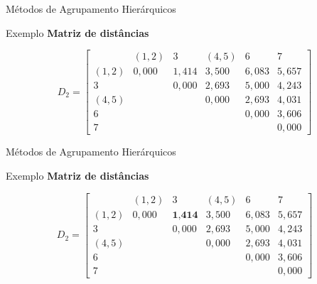 \documentclass[
  ignorenonframetext,
  aspectratio=169,
]{beamer}
\begin{document}
\begin{frame}{Métodos de Agrupamento Hierárquicos}
\label{muxe9todos-de-agrupamento-hieruxe1rquicos-20}
\begin{block}{Exemplo}
\label{exemplo-9}
\textbf{Matriz de distâncias}

\[D_2 = \left[ \begin{matrix}
&(1,2)&3&(4,5)&6&7\\ 
(1,2)& 0,000 & 1,414 & 3,500 &  6,083 & 5,657 \\
3  &  & 0,000 & 2,693 & 5,000 & 4,243 \\
(4,5)  &  &  & 0,000 &  2,693 & 4,031 \\
6  &  &    &  & 0,000 & 3,606 \\
7  &  &    &  &  & 0,000
                    \end{matrix} \right]\]
\end{block}
\end{frame}

\begin{frame}{Métodos de Agrupamento Hierárquicos}
\label{muxe9todos-de-agrupamento-hieruxe1rquicos-21}
\begin{block}{Exemplo}
\label{exemplo-10}
\textbf{Matriz de distâncias}

\[D_2 = \left[ \begin{matrix}
&(1,2)&3&(4,5)&6&7\\ 
(1,2)& 0,000 & \textbf{1,414} & 3,500 &  6,083 & 5,657 \\
3  &  & 0,000 & 2,693 & 5,000 & 4,243 \\
(4,5)  &  &  & 0,000 &  2,693 & 4,031 \\
6  &  &    &  & 0,000 & 3,606 \\
7  &  &    &  &  & 0,000
                    \end{matrix} \right]\]
\end{block}
\end{frame}
\end{document}
